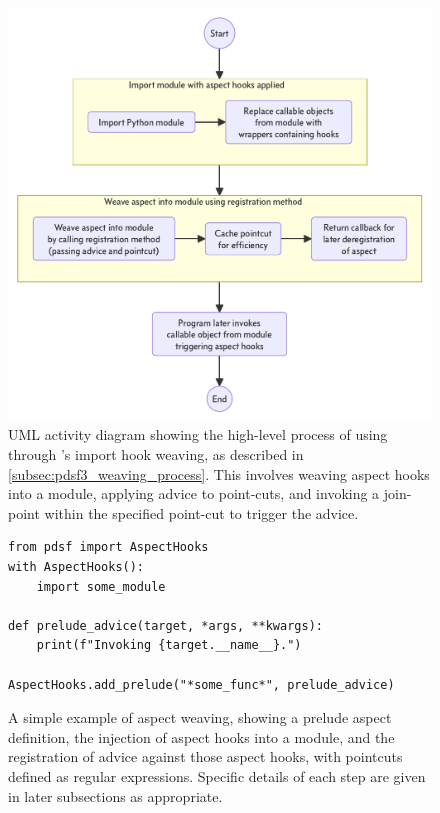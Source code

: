 \begin{figure}
  \centering
  \includegraphics[width=0.8\columnwidth]{40_pydysofu_rewrite/diagrams/aspect-hook-weaving-high-level.pdf}
  \caption{UML activity diagram showing the high-level process of using \aop{} through
  \pdsfthree{}'s import hook weaving, as described in
  \cref{subsec:pdsf3_weaving_process}. This involves weaving aspect hooks into a
  module, applying advice to point-cuts, and invoking a join-point within the
  specified point-cut to trigger the advice.}
  \label{fig:high-level-import-hook-weaving-steps}
\end{figure}


\begin{figure}
    \begin{lstlisting}[style=footnotesize_python]
from pdsf import AspectHooks
with AspectHooks():
    import some_module
    
def prelude_advice(target, *args, **kwargs):
    print(f"Invoking {target.__name__}.")

AspectHooks.add_prelude("*some_func*", prelude_advice)
    \end{lstlisting}
    \caption{A simple example of aspect weaving, showing a prelude aspect definition, the injection of aspect hooks into a module, and the registration of advice against those aspect hooks, with pointcuts defined as regular expressions. Specific details of each step are given in later subsections as appropriate.}
    \label{fig:simple_example_of_aspect_weaving}
\end{figure}

